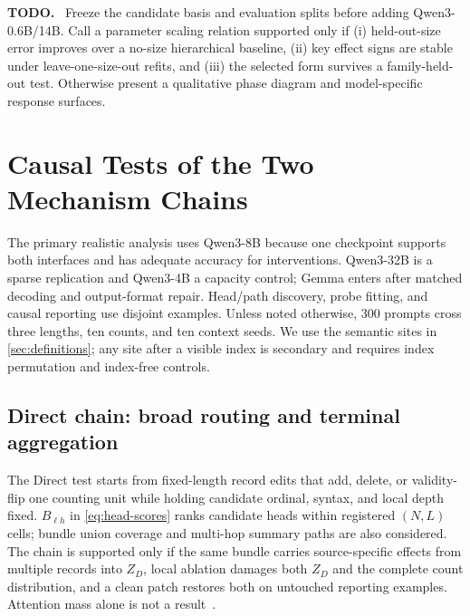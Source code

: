 \documentclass[11pt]{article}
\newenvironment{todobox}
  {\begin{center}\begin{minipage}{0.95\linewidth}\color{todored}\textbf{TODO.}~}
  {\end{minipage}\end{center}}
\begin{document}
\begin{todobox}
Freeze the candidate basis and evaluation splits before adding Qwen3-0.6B/14B. Call a parameter scaling relation supported only if (i) held-out-size error improves over a no-size hierarchical baseline, (ii) key effect signs are stable under leave-one-size-out refits, and (iii) the selected form survives a family-held-out test. Otherwise present a qualitative phase diagram and model-specific response surfaces.
\end{todobox}

\section{Causal Tests of the Two Mechanism Chains}
\label{sec:mechanism}

The primary realistic analysis uses Qwen3-8B because one checkpoint supports both interfaces and has adequate accuracy for interventions. Qwen3-32B is a sparse replication and Qwen3-4B a capacity control; Gemma enters after matched decoding and output-format repair. Head/path discovery, probe fitting, and causal reporting use disjoint examples. Unless noted otherwise, 300 prompts cross three lengths, ten counts, and ten context seeds. We use the semantic sites in \cref{sec:definitions}; any site after a visible index is secondary and requires index permutation and index-free controls.

\subsection{Direct chain: broad routing and terminal aggregation}

The Direct test starts from fixed-length record edits that add, delete, or validity-flip one counting unit while holding candidate ordinal, syntax, and local depth fixed. $B_{\ell h}$ in \cref{eq:head-scores} ranks candidate heads within registered $(N,L)$ cells; bundle union coverage and multi-hop summary paths are also considered. The chain is supported only if the same bundle carries source-specific effects from multiple records into $Z_D$, local ablation damages both $Z_D$ and the complete count distribution, and a clean patch restores both on untouched reporting examples. Attention mass alone is not a result~\citep{jain2019attention}.
\end{document}
